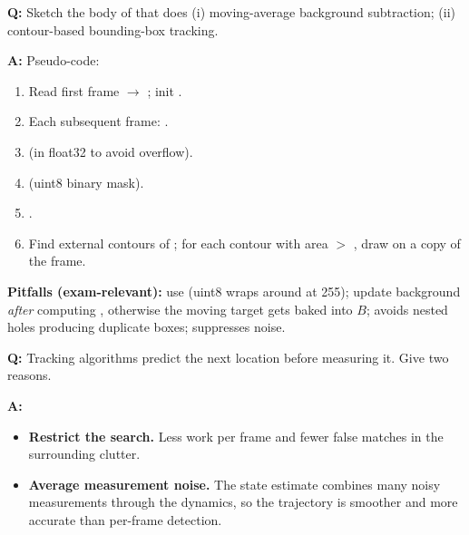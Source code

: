 \begin{exbox}
\textbf{Q:} Sketch the body of  that does (i) moving-average background subtraction; (ii) contour-based bounding-box tracking.

\textbf{A:} Pseudo-code:
\begin{enumerate}
  \item Read first frame $\to$ ; init .
  \item Each subsequent frame: .
  \item {} (in float32 to avoid overflow).
  \item {} (uint8 binary mask).
  \item {}.
  \item Find external contours of ; for each contour with area $>$ , draw  on a copy of the frame.
\end{enumerate}
\textbf{Pitfalls (exam-relevant):} use  (uint8 wraps around at 255); update background \emph{after} computing , otherwise the moving target gets baked into $B$;  avoids nested holes producing duplicate boxes;  suppresses noise.
\end{exbox}

\begin{exbox}
\textbf{Q:} Tracking algorithms predict the next location before measuring it. Give two reasons.

\textbf{A:}
\begin{itemize}
  \item \textbf{Restrict the search.} Less work per frame and fewer false matches in the surrounding clutter.
  \item \textbf{Average measurement noise.} The state estimate combines many noisy measurements through the dynamics, so the trajectory is smoother and more accurate than per-frame detection.
\end{itemize}
\end{exbox}

